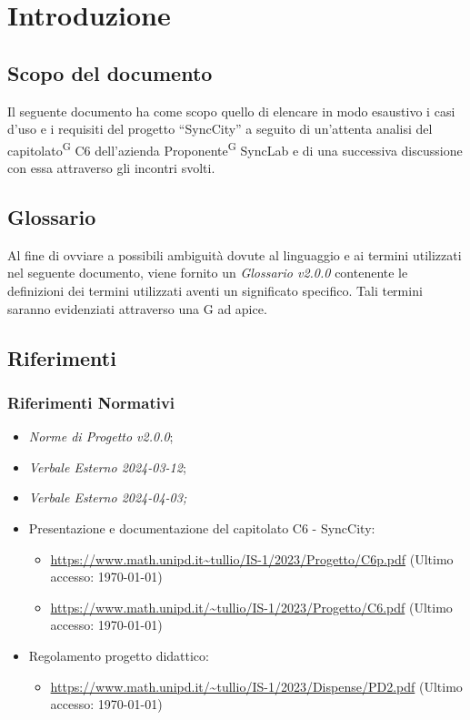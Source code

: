 \documentclass[8pt]{article}
\newcommand{\glossterm}[1]{#1\textsuperscript{G}} %
\begin{document}
\section{Introduzione}
\subsection{Scopo del documento}
Il seguente documento ha come scopo quello di elencare in modo esaustivo i casi d'uso e i requisiti
del progetto ``SyncCity'' a seguito di un'attenta analisi del \glossterm{capitolato} C6 dell'azienda \glossterm{Proponente} SyncLab e di una successiva discussione con essa attraverso gli incontri svolti.
\subsection{Glossario}
Al fine di ovviare a possibili ambiguità dovute al linguaggio e ai termini utilizzati nel seguente
documento, viene fornito un \textit{Glossario v2.0.0} contenente le definizioni dei termini utilizzati aventi un significato specifico. Tali termini saranno evidenziati attraverso una G ad apice.
\subsection{Riferimenti}
\subsubsection{Riferimenti Normativi}
\begin{itemize}
	\setlength\itemsep{0em}
	\item \textit{Norme di Progetto v2.0.0};
	\item \textit{Verbale Esterno 2024-03-12};
	\item \textit{Verbale Esterno 2024-04-03;}
  \item Presentazione e documentazione del capitolato C6 - SyncCity:
	\begin{itemize}
		\item \href{https://www.math.unipd.it/~tullio/IS-1/2023/Progetto/C6p.pdf}{https://www.math.unipd.it\textasciitilde{}tullio/IS-1/2023/Progetto/C6p.pdf} (Ultimo accesso: \today)
		\item \href{https://www.math.unipd.it/~tullio/IS-1/2023/Progetto/C6.pdf}{https://www.math.unipd.it/\textasciitilde{}tullio/IS-1/2023/Progetto/C6.pdf} (Ultimo accesso: \today)
\end{itemize}
	\item Regolamento progetto didattico: 
      \begin{itemize}
          \item \href{https://www.math.unipd.it/~tullio/IS-1/2023/Dispense/PD2.pdf}{https://www.math.unipd.it/\textasciitilde{}tullio/IS-1/2023/Dispense/PD2.pdf} (Ultimo accesso: \today)
    \end{itemize}
\end{itemize}
\end{document}
